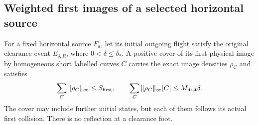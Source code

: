 \subsection{Weighted first images of a selected horizontal source}

\begin{lemma}
\label{lem:ce-first}
For a fixed horizontal source $F_a$, let its initial outgoing
flight satisfy the original clearance event $E_{\delta,R}$,
where $0<\delta\le\delta_*$.  A positive cover of its first
physical image by homogeneous short labelled curves $C$ carries
the exact image densities $\rho_C$ and satisfies
\begin{equation}\label{eq:ce-first-budgets}
 \sum_C\|\rho_C\|_\infty\le S_{\rm first},\qquad
 \sum_C\|\rho_C\|_\infty|C|\le M_{\rm first}\delta .
\end{equation}
The cover may include further initial states, but each of them
follows its actual first collision.  There is no reflection at a
clearance foot.
\end{lemma}
